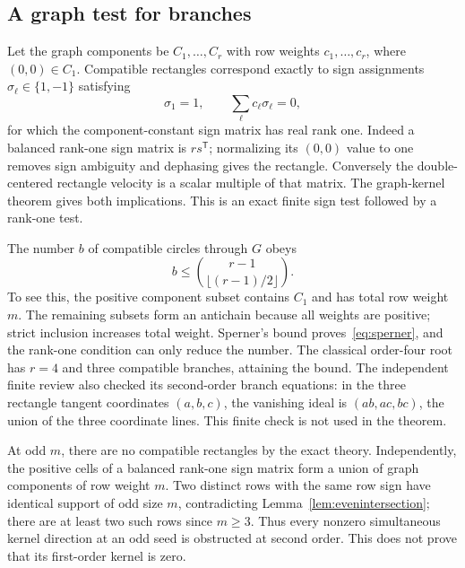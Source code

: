 \subsection{A graph test for branches}
Let the graph components be $C_1,\ldots,C_r$ with row weights $c_1,\ldots,c_r$, where $(0,0)\in C_1$. Compatible rectangles correspond exactly to sign assignments $\sigma_\ell\in\{1,-1\}$ satisfying
\begin{equation}\label{eq:signassignment}
 \sigma_1=1,\qquad\sum_\ell c_\ell\sigma_\ell=0,
\end{equation}
for which the component-constant sign matrix has real rank one. Indeed a balanced rank-one sign matrix is $rs^{\mathsf T}$; normalizing its $(0,0)$ value to one removes sign ambiguity and dephasing gives the rectangle. Conversely the double-centered rectangle velocity is a scalar multiple of that matrix. The graph-kernel theorem gives both implications. This is an exact finite sign test followed by a rank-one test.

The number $b$ of compatible circles through $G$ obeys
\begin{equation}\label{eq:sperner}
 b\le\binom{r-1}{\lfloor(r-1)/2\rfloor}.
\end{equation}
To see this, the positive component subset contains $C_1$ and has total row weight $m$. The remaining subsets form an antichain because all weights are positive; strict inclusion increases total weight. Sperner's bound proves~\eqref{eq:sperner}, and the rank-one condition can only reduce the number. The classical order-four root has $r=4$ and three compatible branches, attaining the bound. The independent finite review also checked its second-order branch equations: in the three rectangle tangent coordinates $(a,b,c)$, the vanishing ideal is $(ab,ac,bc)$, the union of the three coordinate lines. This finite check is not used in the theorem.

At odd $m$, there are no compatible rectangles by the exact theory. Independently, the positive cells of a balanced rank-one sign matrix form a union of graph components of row weight $m$. Two distinct rows with the same row sign have identical support of odd size $m$, contradicting Lemma~\ref{lem:evenintersection}; there are at least two such rows since $m\ge3$. Thus every nonzero simultaneous kernel direction at an odd seed is obstructed at second order. This does not prove that its first-order kernel is zero.
